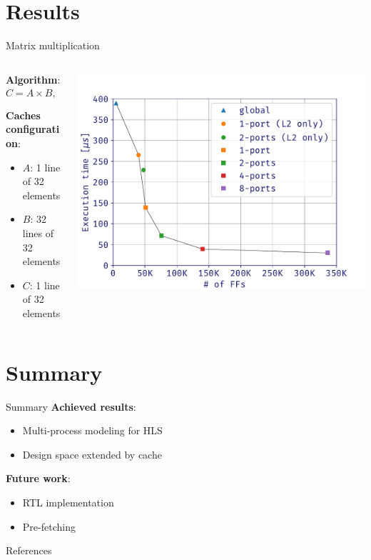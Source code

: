 \documentclass[aspectratio=169]{beamer}
\begin{document}
\section{Results}
\begin{frame}{Matrix multiplication}
	\begin{columns}[c]
		\begin{column}{.5\textwidth}
			\textbf{Algorithm}:
			\[C = A \times B, \quad A, B, C \in \mathbb{R}^{32 \times 32}\]

			\textbf{Caches configuration}:
			\begin{itemize}
				\item $A$: 1 line of 32 elements
				\item $B$: 32 lines of 32 elements
				\item $C$: 1 line of 32 elements
			\end{itemize}
		\end{column}
		\begin{column}{.5\textwidth}
			\begin{center}
				\includegraphics[width=\textwidth]{plot}
			\end{center}
		\end{column}
	\end{columns}
\end{frame}

\section{Summary}
\begin{frame}{Summary}
	\textbf{Achieved results}:
	\begin{itemize}
		\item Multi-process modeling for HLS
		\item Design space extended by cache
	\end{itemize}

	\bigskip
	\textbf{Future work}:
	\begin{itemize}
		\item RTL implementation
		\item Pre-fetching
	\end{itemize}
\end{frame}

\begin{frame}{References}
	\nocite{*}
	\printbibliography[heading=none]
\end{frame}
\end{document}
